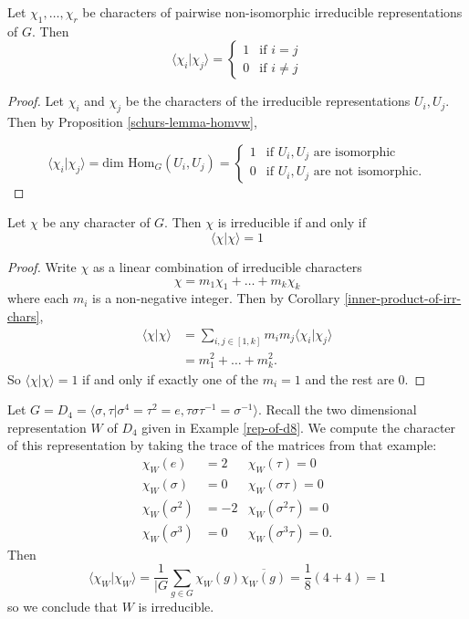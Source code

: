 \begin{cor}\label{inner-product-of-irr-chars}
Let $\chi_1, \ldots, \chi_r$ be characters of pairwise non-isomorphic irreducible representations of $G$.  Then
\[ \langle \chi_i | \chi_j \rangle = \begin{cases}  1 &\text{if } i = j \\ 0 &\text{if } i \neq j\end{cases} \]
\end{cor}
\begin{proof}
Let $\chi_i$ and $\chi_j$ be the characters of the irreducible representations $U_i, U_j$.  Then by Proposition \ref{schurs-lemma-homvw},

\[ \langle \chi_i | \chi_j \rangle = \text{dim Hom}_G (U_i, U_j) = \begin{cases}  1 &\text{if }U_i, U_j \text{ are isomorphic} \\  0 &\text{if }U_i, U_j \text{ are not isomorphic}. \end{cases} \]
\end{proof}

\begin{cor}
Let $\chi$ be any character of $G$.    Then $\chi$ is irreducible if and only if \[ \langle \chi | \chi \rangle = 1\]
\end{cor}
\begin{proof}
Write $\chi$ as a linear combination of irreducible characters \[ \chi = m_1 \chi_1 + \ldots + m_k \chi_k \] where each $m_i$ is a non-negative integer.  Then by Corollary \ref{inner-product-of-irr-chars}, 
\begin{align*}
\langle \chi | \chi \rangle &= \sum_{i,j \in [1, k]} m_i m_j \langle \chi_i | \chi_j \rangle \\
&= m_1^2 + \ldots + m_k^2.
\end{align*}
So $\langle \chi | \chi \rangle = 1$ if and only if exactly one of the $m_i = 1$ and the rest are $0$.
\end{proof}

\begin{example}\label{irr-char-of-d8}
Let $G=D_4=  \langle \sigma, \tau |  \sigma^4 = \tau^2 = e, \tau \sigma \tau^{-1} = \sigma^{-1} \rangle$.  Recall the two dimensional representation $W$ of $D_4$ given in Example \ref {rep-of-d8}.
We compute the character of this representation by taking the trace of the matrices from that example:
\begin{align*}
\chi_W(e) &=2 & \chi_W(\tau) = 0 \\
\chi_W(\sigma) &= 0 &\chi_W (\sigma \tau) = 0 \\
\chi_W(\sigma^2) &= -2 &\chi_W (\sigma^2 \tau) = 0 \\
\chi_W(\sigma^3) &= 0 &\chi_W (\sigma^3 \tau) = 0.
\end{align*}
Then
\[ \langle \chi_W | \chi_W \rangle =\frac {1}{|G} \sum_{g \in G} \chi_W (g) \overline{\chi_W (g)} = \frac{1}{8} (4 + 4) = 1\]
so we conclude that $W$ is irreducible.
\end{example}


